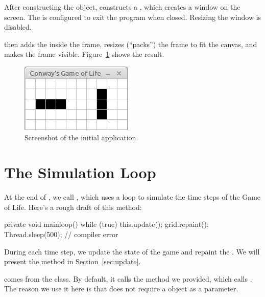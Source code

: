 
After constructing the  object,  constructs a , which creates a window on the screen.
The  is configured\footnotemark{} to exit the program when closed.
Resizing the window is disabled.


 then adds the  inside the frame, resizes (``packs'') the frame to fit the canvas, and makes the frame visible.
Figure~\ref{fig:conway} shows the result.

\begin{figure}[!ht]
\begin{center}
\includegraphics{figs/conway.png}
\caption{Screenshot of the initial  application.}
\label{fig:conway}
\end{center}
\end{figure}


\section{The Simulation Loop}
\label{mainloop}

At the end of , we call , which uses a  loop to simulate the time steps of the Game of Life.
Here's a rough draft of this method:

\begin{code}
private void mainloop() {
    while (true) {
        this.update();
        grid.repaint();
        Thread.sleep(500);    // compiler error
    }
}
\end{code}

During each time step, we update the state of the game and repaint the .
We will present the  method in Section~\ref{sec:update}.

 comes from the  class.
By default, it calls the  method we provided, which calls .
The reason we use it here is that  does not require a  object as a parameter.

